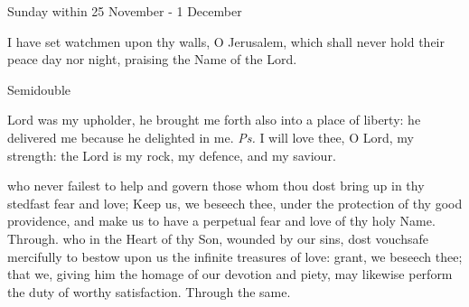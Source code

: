 \begin{multicols}{2}
\begin{inhead}
Sunday within 25 November - 1 December
\end{inhead}\par\noindent
I have set watchmen {\dag} upon thy walls, O Jerusalem, which shall never hold their peace day nor night, praising the Name of the Lord.
\end{multicols}

\clearpage
{}
\begin{inhead}
    {Semidouble}
\end{inhead}
\par\noindent
{}



\introit
{} Lord was my upholder, he brought me forth also into a place of liberty: he delivered me because he delighted in me. \textit{Ps.} I will love thee, O Lord, my strength: the Lord is my rock, my defence, and my saviour.

\collect
{} who never failest to help and govern those whom thou dost bring up in thy stedfast fear and love; Keep us, we beseech thee, under the protection of thy good providence, and make us to have a perpetual fear and love of thy holy Name. Through.
 who in the Heart of thy Son, wounded by our sins, dost vouchsafe mercifully to bestow upon us the infinite treasures of love: grant, we beseech thee; that we, giving him the homage of our devotion and piety, may likewise perform the duty of worthy satisfaction. Through the same.

